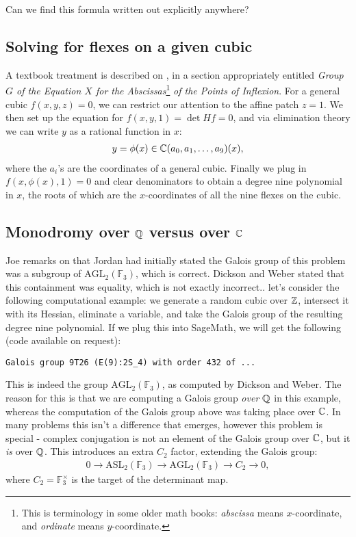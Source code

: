 \documentclass[11pt]{amsart}
\providecommand{\ASL}{\mathrm{ASL}}
\begin{document}
\begin{question} Can we find this formula written out explicitly anywhere?
\end{question}

\subsection{Solving for flexes on a given cubic}

A textbook treatment is described on \cite[p.~333]{MillerBlichfeldtDickson}, in a section appropriately entitled \emph{Group $G$ of the Equation $X$ for the Abscissas}\footnote{This is terminology in some older math books: \textit{abscissa} means $x$-coordinate, and \textit{ordinate} means $y$-coordinate.} \emph{of the Points of Inflexion}. For a general cubic $f(x,y,z)=0$, we can restrict our attention to the affine patch $z=1$. We then set up the equation for $f(x,y,1)=\det Hf = 0$, and via elimination theory we can write $y$ as a rational function in $x$:
\begin{align*}
    y = \phi(x) \in \mathbb{C}(a_0,a_1, \ldots, a_9)(x),
\end{align*}
where the $a_i$'s are the coordinates of a general cubic. Finally we plug in $f(x,\phi(x),1) =0$ and clear denominators to obtain a degree nine polynomial in $x$, the roots of which are the $x$-coordinates of all the nine flexes on the cubic.

\subsection{Monodromy over $\mathbb{Q}$ versus over $\mathbb{C}$}
Joe remarks on \cite[p.~696]{Harris-Galois} that Jordan had initially stated the Galois group of this problem was a subgroup of $\mathrm{AGL}_2(\mathbb{F}_3)$, which is correct. Dickson and Weber stated that this containment was equality, which is not exactly incorrect.. let's consider the following computational example: we generate a random cubic over $\mathbb{Z}$, intersect it with its Hessian, eliminate a variable, and take the Galois group of the resulting degree nine polynomial. If we plug this into SageMath, we will get the following (code available on request):

\begin{verbatim}
Galois group 9T26 (E(9):2S_4) with order 432 of ...
\end{verbatim}

This is indeed the group $\mathrm{AGL}_2(\mathbb{F}_3)$, as computed by Dickson and Weber. The reason for this is that we are computing a Galois group \textit{over $\mathbb{Q}$} in this example, whereas the computation of the Galois group above was taking place over $\mathbb{C}$. In many problems this isn't a difference that emerges, however this problem is special - complex conjugation is not an element of the Galois group over $\mathbb{C}$, but it \textit{is} over $\mathbb{Q}$. This introduces an extra $C_2$ factor, extending the Galois group:
\begin{align*}
    0 \to \ASL_2(\mathbb{F}_3) \to \mathrm{AGL}_2(\mathbb{F}_3) \to C_2 \to 0,
\end{align*}
where $C_2 = \mathbb{F}_3^\times$ is the target of the determinant map.
\end{document}

